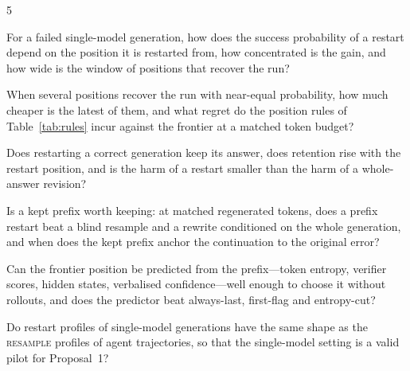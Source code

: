 \documentclass[10pt,a4paper]{article}
\begin{document}
\begin{rqbox}{5}
\begin{description}[leftmargin=3.2em,style=sameline,font=\bfseries,itemsep=1.5pt]
\item[RQ\,5.1] For a failed single-model generation, how does the success probability of a restart depend on the position it is restarted from, how concentrated is the gain, and how wide is the window of positions that recover the run?
\item[RQ\,5.2] When several positions recover the run with near-equal probability, how much cheaper is the latest of them, and what regret do the position rules of Table~\ref{tab:rules} incur against the frontier at a matched token budget?
\item[RQ\,5.3] Does restarting a correct generation keep its answer, does retention rise with the restart position, and is the harm of a restart smaller than the harm of a whole-answer revision?
\item[RQ\,5.4] Is a kept prefix worth keeping: at matched regenerated tokens, does a prefix restart beat a blind resample and a rewrite conditioned on the whole generation, and when does the kept prefix anchor the continuation to the original error?
\item[RQ\,5.5] Can the frontier position be predicted from the prefix---token entropy, verifier scores, hidden states, verbalised confidence---well enough to choose it without rollouts, and does the predictor beat always-last, first-flag and entropy-cut?
\item[RQ\,5.6] Do restart profiles of single-model generations have the same shape as the \textsc{resample} profiles of agent trajectories, so that the single-model setting is a valid pilot for Proposal~1?
\end{description}
\end{rqbox}
\end{document}
